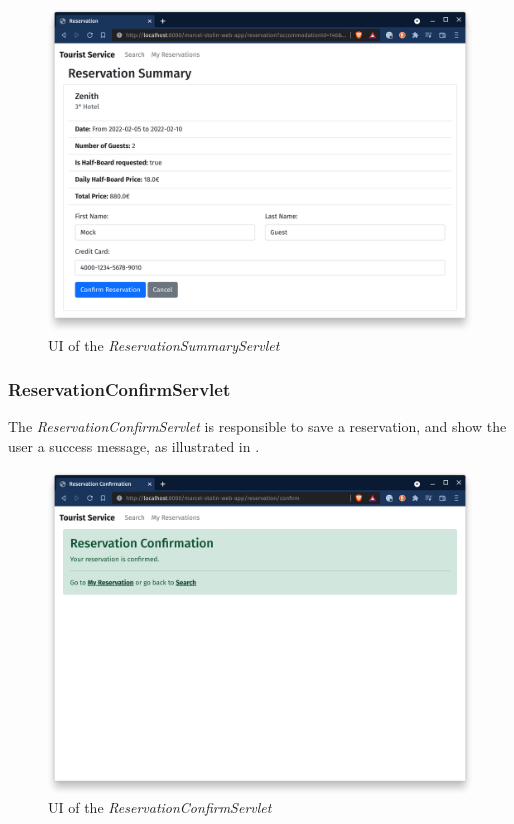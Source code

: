 \begin{figure}[h]
\centering
\includegraphics[scale=0.14]{images/02_design/web-app-reservation-summary}
\caption{UI of the \textit{ReservationSummaryServlet}}
\label{fig:02_design_web_reservationsummary_page}
\end{figure}

\newpage
\subsubsection{ReservationConfirmServlet}\label{sec:02_design_web_reservationconfirm}
The \textit{ReservationConfirmServlet} is responsible to save a reservation, and show the user a success message, as illustrated in .

\begin{figure}[h]
\centering
\includegraphics[scale=0.14]{images/02_design/web-app-reservation-confirm}
\caption{UI of the \textit{ReservationConfirmServlet}}
\label{fig:02_design_web_reservationconfirm_page}
\end{figure}

